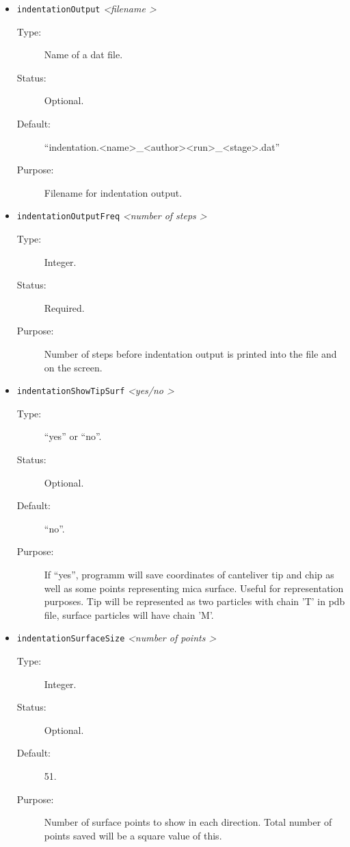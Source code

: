\documentclass[a4paper]{article}
\begin{document}
\begin{itemize}
\item \texttt{indentationOutput} \textit{\textless filename \textgreater}
\begin{description}
\item[Type:] Name of a dat file.
\item[Status:] Optional.
\item[Default:] ``indentation.\textless name\textgreater\_\textless author\textgreater\textless run\textgreater\_\textless stage\textgreater.dat''
\item[Purpose:] Filename for indentation output.
\end{description}

\item \texttt{indentationOutputFreq} \textit{\textless number of steps \textgreater}
\begin{description}
\item[Type:] Integer.
\item[Status:] Required.
\item[Purpose:] Number of steps before indentation output is printed into the file and on the screen.
\end{description}

\item \texttt{indentationShowTipSurf} \textit{\textless yes/no \textgreater}
\begin{description}
\item[Type:] ``yes'' or ``no''.
\item[Status:] Optional.
\item[Default:] ``no''.
\item[Purpose:] If ``yes'', programm will save coordinates of canteliver tip and chip as well as some points representing mica surface. Useful for representation purposes. Tip will be represented as two particles with chain 'T' in pdb file, surface particles will have chain 'M'.
\end{description}

\item \texttt{indentationSurfaceSize} \textit{\textless number of points \textgreater}
\begin{description}
\item[Type:] Integer.
\item[Status:] Optional.
\item[Default:] 51.
\item[Purpose:] Number of surface points to show in each direction. Total number of points saved will be a square value of this.
\end{description}


\end{itemize}
\end{document}

